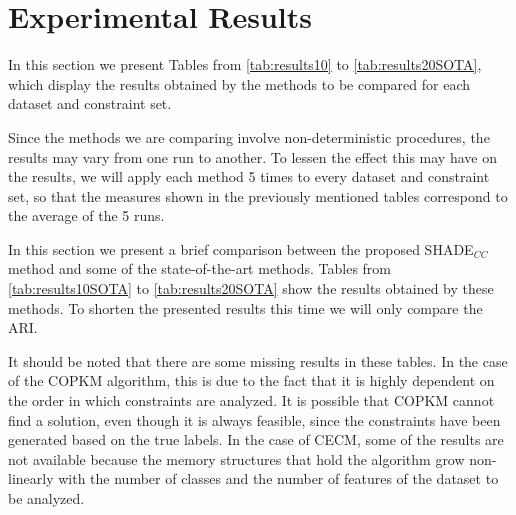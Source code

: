 \documentclass[review]{elsarticle}
\begin{document}
\section{Experimental Results} \label{sec:results}

In this section we present Tables from \ref{tab:results10} to \ref{tab:results20SOTA}, which display the results obtained by the methods to be compared for each dataset and constraint set.

Since the methods we are comparing involve non-deterministic procedures, the results may vary from one run to another. To lessen the effect this may have on the results, we will apply each method 5 times to every dataset and constraint set, so that the measures shown in the previously mentioned tables correspond to the average of the 5 runs.

In this section we present a brief comparison between the proposed SHADE$_{CC}$ method and some of the state-of-the-art methods. Tables from \ref{tab:results10SOTA} to \ref{tab:results20SOTA} show the results obtained by these methods. To shorten the presented results this time we will only compare the ARI.

It should be noted that there are some missing results in these tables. In the case of the COPKM algorithm, this is due to the fact that it is highly dependent on the order in which constraints are analyzed. It is possible that COPKM cannot find a solution, even though it is always feasible, since the constraints have been generated based on the true labels. In the case of CECM, some of the results are not available because the memory structures that hold the algorithm grow non-linearly with the number of classes and the number of features of the dataset to be analyzed.
	
\end{document}
